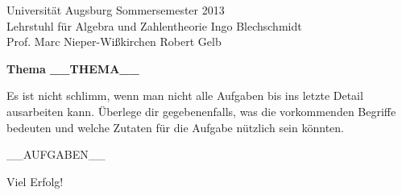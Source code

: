 \documentclass{../algblatt}
\begin{document}
\vspace*{-1.2cm}

Universität Augsburg \hfill Sommersemester 2013 \\
Lehrstuhl für Algebra und Zahlentheorie \hfill Ingo Blechschmidt \\
Prof. Marc Nieper-Wißkirchen \hfill Robert Gelb \\[0em]

\begin{center}
  {\Large \textbf{Thema __THEMA__}} \\[2.6em]

  \begin{minipage}{0.93\textwidth}
    \setlength\parskip{\medskipamount}
    Es ist nicht schlimm, wenn man nicht alle Aufgaben bis ins letzte Detail
    ausarbeiten kann. Überlege dir gegebenenfalls, was die
    vorkommenden Begriffe bedeuten und welche Zutaten für die Aufgabe nützlich
    sein könnten.
  \end{minipage}
\end{center}
\vspace{1em}

__AUFGABEN__

\begin{center}Viel Erfolg!\end{center}
\end{document}
